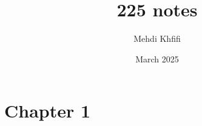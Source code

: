 \documentclass{article}
\title{225 notes}
\author{Mehdi Khfifi}
\date{March 2025}
\begin{document}
\maketitle

\section{Chapter 1}
\end{document}
